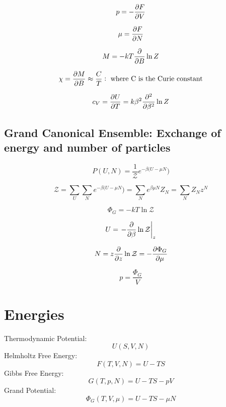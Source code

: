 \documentclass{article}
\begin{document}
\begin{equation}
	p=-\pdv{F}{V}
\end{equation}

\begin{equation}
	\mu=\pdv{F}{N}
\end{equation}

\begin{equation}
	M=-kT\pdv{B}\ln Z
\end{equation}

\begin{equation}
	\chi=\pdv{M}{B}\approx\frac{C}{T}:\text{   where C is the Curie constant}
\end{equation}

\begin{equation}
	c_V=\pdv{U}{T}=k\beta ^2\pdv[2]{\beta}\ln Z
\end{equation}

\subsection{Grand Canonical Ensemble: \normalfont Exchange of energy and number of particles}

\begin{equation}
	P(U,N)=\frac{1}{\mathcal{Z}}e^{-\beta(U-\mu N})
\end{equation}

\begin{equation}
	\mathcal{Z}=\sum_U \sum_N e^{-\beta(U-\mu N})=\sum_N e^{\beta\mu N}Z_N=\sum_N Z_Nz^N
\end{equation}

\begin{equation}
	\Phi_G=-kT\ln\mathcal{Z}
\end{equation}

\begin{equation}
	U=\left.-\pdv{\beta}\ln\mathcal{Z}\right\rvert_z
\end{equation}

\begin{equation}
	N=z\pdv{z}\ln\mathcal{Z}=-\pdv{\Phi_G}{\mu}
\end{equation}

\begin{equation}
	p=\frac{\Phi_G}{V}
\end{equation}

\section{Energies}

Thermodynamic Potential:
\begin{equation}
	U(S, V, N)
\end{equation}
%
Helmholtz Free Energy:
\begin{equation}
	F(T, V, N)=U-TS
\end{equation}
%
Gibbs Free Energy:
\begin{equation}
	G(T, p, N)=U-TS-pV
\end{equation}
%
Grand Potential:
\begin{equation}
	\Phi_G(T, V, \mu)=U-TS-\mu N
\end{equation}
\end{document}
